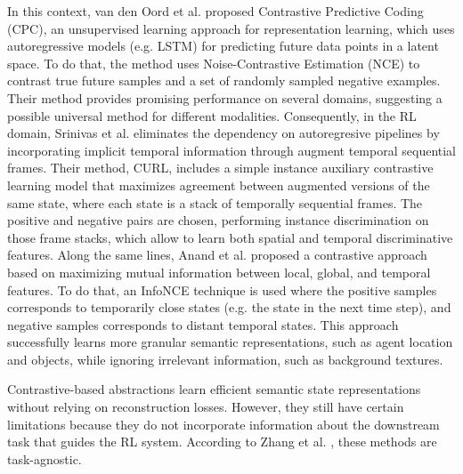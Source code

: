 In this context, van den Oord et al. \cite{oord2018representation} proposed Contrastive Predictive Coding (CPC), an unsupervised learning approach for representation learning, which uses autoregressive models (e.g. LSTM) for predicting future data points in a latent space. To do that, the method uses Noise-Contrastive Estimation (NCE) to contrast true future samples and a set of randomly sampled negative examples. Their method provides promising performance on several domains, suggesting a possible universal method for different modalities. Consequently, in the RL domain, Srinivas et al. \cite{laskin2020curl} eliminates the dependency on autoregresive pipelines by incorporating implicit temporal information through augment temporal sequential frames. Their method, CURL, includes a simple instance auxiliary contrastive learning model that maximizes agreement between augmented versions of the same state, where each state is a stack of temporally sequential frames. The positive and negative pairs are chosen, performing instance discrimination on those frame stacks, which allow to learn both spatial and temporal discriminative features. Along the same lines, Anand et al. \cite{anand2019unsupervised} proposed a contrastive approach based on maximizing mutual information between local, global, and temporal features. To do that, an InfoNCE technique is used where the positive samples corresponds to temporarily close states (e.g. the state in the next time step), and negative samples corresponds to distant temporal states. This approach successfully learns more granular semantic representations, such as agent location and objects, while ignoring irrelevant information, such as background textures.




Contrastive-based abstractions learn efficient semantic state representations without relying on reconstruction losses. However, they still have certain limitations because they do not incorporate information about the downstream task that guides the RL system. According to Zhang et al. \cite{zhang2020learning}, these methods are task-agnostic.

